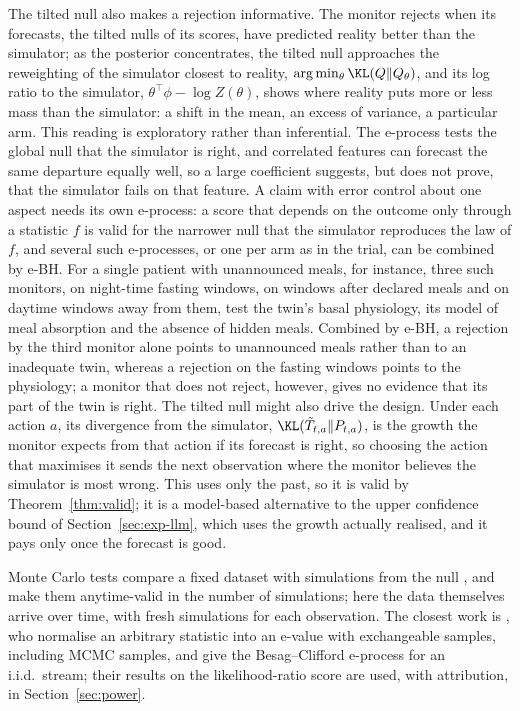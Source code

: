 The tilted null also makes a rejection informative. The monitor rejects when
its forecasts, the tilted nulls of its scores, have predicted reality better
than the simulator; as the posterior concentrates, the tilted null approaches
the reweighting of the simulator closest to reality,
$\arg\min_\theta \KL(Q\|Q_\theta)$, and its log ratio to the simulator,
$\theta^\top\phi - \log Z(\theta)$, shows where reality puts more or less mass
than the simulator: a shift in the mean, an excess of variance, a particular
arm. This reading is exploratory rather than inferential. The e-process tests
the global null that the simulator is right, and correlated features can
forecast the same departure equally well, so a large coefficient suggests, but
does not prove, that the simulator fails on that feature. A claim with error
control about one aspect needs its own e-process: a score that depends on the
outcome only through a statistic $f$ is valid for the narrower null that the
simulator reproduces the law of $f$, and several such e-processes, or one per
arm as in the trial, can be combined by e-BH. For a single patient with
unannounced meals, for instance, three such monitors, on night-time fasting
windows, on windows after declared meals and on daytime windows away from
them, test the twin's basal physiology, its model of meal absorption and the
absence of hidden meals. Combined by e-BH, a rejection by the third monitor
alone points to unannounced meals rather than to an inadequate twin, whereas a
rejection on the fasting windows points to the physiology; a monitor that does
not reject, however, gives no evidence that its part of the twin is right.
The tilted null might also drive the design. Under each action $a$, its
divergence from the simulator, $\KL(\tilde T_{t,a}\|P_{t,a})$, is the growth
the monitor expects from that action if its forecast is right, so choosing the
action that maximises it sends the next observation where the monitor believes
the simulator is most wrong. This uses only the past, so it is valid by
Theorem~\ref{thm:valid}; it is a model-based alternative to the upper
confidence bound of Section~\ref{sec:exp-llm}, which uses the growth actually
realised, and it pays only once the forecast is good.

Monte Carlo tests compare a fixed dataset with simulations from the null
\citep{besag1989generalized}, and \citet{fischer2024sequential} make them
anytime-valid in the number of simulations; here the data themselves arrive
over time, with fresh simulations for each observation. The closest work is
\citet{dombowsky2026besag}, who normalise an arbitrary statistic into an
e-value with exchangeable samples, including MCMC samples, and give the
Besag--Clifford e-process for an i.i.d.\ stream; their results on the
likelihood-ratio score are used, with attribution, in
Section~\ref{sec:power}.

